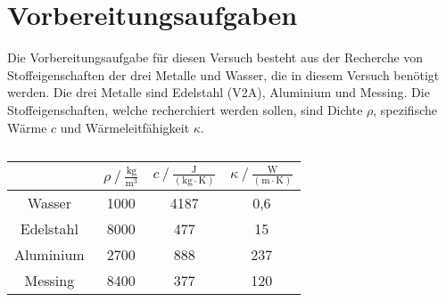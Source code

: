 \section{Vorbereitungsaufgaben}

\begin{flushleft}
    Die Vorbereitungsaufgabe für diesen Versuch besteht aus der Recherche von Stoffeigenschaften der drei Metalle und Wasser, die in diesem Versuch benötigt werden. 
    Die drei Metalle sind Edelstahl (V2A), Aluminium und Messing. Die Stoffeigenschaften, welche recherchiert werden sollen, sind Dichte $ \rho $, spezifische Wärme $ c $ und Wärmeleitfähigkeit $ \kappa $. 
\end{flushleft}

\begin{table}
    \centering
    \caption{}
    \label{Tabelle}
    \begin{tabular} {c||  c  c  c}
        \toprule
        {$ $} &
        {$ \rho \mathbin{/} \frac{\unit{\kilo\gram}}{\unit{\meter^3}} $} &
        {$ c \mathbin{/} \frac{\unit{\joule}}{(\unit{\kilo\gram} \cdot \unit{\kelvin})} $} &
        {$ \kappa  \mathbin{/} \frac{\unit{\watt}}{(\unit{\meter} \cdot \unit{\kelvin})} $} \\
        \midrule
        Wasser\,\,\cite{a2}  & 1000 & 4187 & 0,6  \\
        Edelstahl\,\,\cite{a3}\cite{a5}  & 8000 & 477 & 15  \\
        Aluminium\,\,\cite{a3}\cite{a4}\cite{a7}  & 2700 & 888 & 237  \\
        Messing\,\,\cite{a3}\cite{a4}\cite{a6}  & 8400 & 377 & 120  \\
    \end{tabular} 
\end{table}